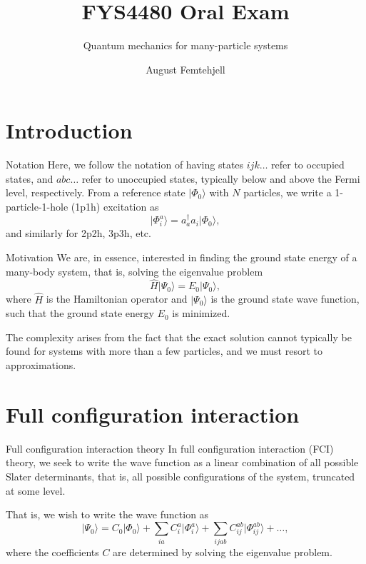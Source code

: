 \documentclass[UKenglish,aspectratio=169]{beamer}
\title{FYS4480 Oral Exam}
\subtitle{Quantum mechanics for many-particle systems}
\author{August Femtehjell}
\begin{document}
\uiofrontpage[
    date={16th December, 2024},
]

\section{Introduction}
\begin{frame}{Notation}
    Here, we follow the notation of having states $ijk\ldots$ refer to occupied states, and $abc\ldots$ refer to unoccupied states, typically below and above the Fermi level, respectively.
    From a reference state $\lvert \Phi_0 \rangle$ with $N$ particles, we write a 1-particle-1-hole (1p1h) excitation as
    \begin{equation}
        \lvert \Phi_{i}^{a} \rangle
        = a_{a}^\dagger a_{i} \lvert \Phi_0 \rangle,
    \end{equation}
    and similarly for 2p2h, 3p3h, etc.
\end{frame}

\begin{frame}{Motivation}
    We are, in essence, interested in finding the ground state energy of a many-body system, that is, solving the eigenvalue problem
    \begin{equation}
        \hat{H} \lvert \Psi_0 \rangle = E_0 \lvert \Psi_0 \rangle,
    \end{equation}
    where $\hat{H}$ is the Hamiltonian operator and $\lvert \Psi_0 \rangle$ is the ground state wave function, such that the ground state energy $E_0$ is minimized.

    \bigskip

    The complexity arises from the fact that the exact solution cannot typically be found for systems with more than a few particles, and we must resort to approximations.
\end{frame}

\section{Full configuration interaction}

\begin{frame}{Full configuration interaction theory}
    In full configuration interaction (FCI) theory, we seek to write the wave function as a linear combination of all possible Slater determinants, that is, all possible configurations of the system, truncated at some level.

    \bigskip

    That is, we wish to write the wave function as
    \begin{equation}
        \lvert \Psi_0 \rangle
        = C_0 \lvert \Phi_0 \rangle
        + \sum_{ia} C_i^a \lvert \Phi_i^a \rangle
        + \sum_{ijab} C_{ij}^{ab} \lvert \Phi_{ij}^{ab} \rangle
        + \ldots,
    \end{equation}
    where the coefficients $C$ are determined by solving the eigenvalue problem.
\end{frame}
\end{document}
